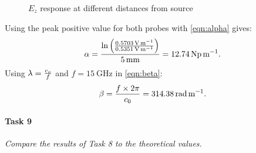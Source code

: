\begin{figure}[tbph]
	\centering
	\caption{$E_z$ response at different distances from source}
	\label{fig:Task3-probes}
\end{figure}

Using the peak positive value for both probes with \eqref{eqn:alpha} gives:
\begin{equation*}
	\alpha = { \ln \left( { \SI{0.5703}{\volt\per\meter} \over \SI{0.5351}{\volt\per\meter} } \right) \over \SI{5}{\milli\meter}} = \SI{12.74}{\neper\per\meter}.
\end{equation*}
Using $\lambda = {c_o \over f}$ and $f = \SI{15}{\giga\hertz}$ in \eqref{eqn:beta}:
\begin{equation*}
	\beta = {f \times 2 \pi \over c_0} = \SI{314.38}{\radian\per\meter}.
\end{equation*}

\paragraph{Task 9} \textit{Compare the results of Task 8 to the theoretical values.}

